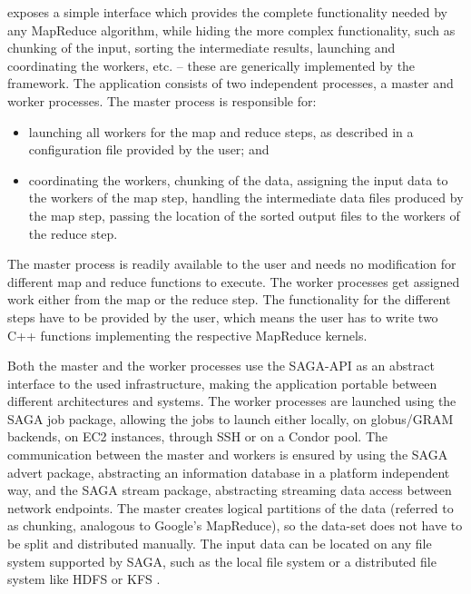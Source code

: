 \documentclass[3p,twocolumn]{elsarticle}
\begin{document}
\smr exposes a simple interface which provides the complete
functionality needed by any MapReduce algorithm, while hiding the more
complex functionality, such as chunking of the input, sorting the
intermediate results, launching and coordinating the workers, etc. --
these are generically implemented by the framework.  The application
consists of two independent processes, a master and worker processes.
The master process is responsible for:

\begin{itemize}

 \item launching all workers for the map and reduce steps, as
 described in a configuration file provided by the user; and

 \item coordinating the workers, chunking of the data, assigning the
 input data to the workers of the map step, handling the intermediate
 data files produced by the map step, passing the location of the
 sorted output files to the workers of the reduce step.  


\end{itemize}

The master process is readily available to the user and needs no
modification for different map and reduce functions to execute.  The
worker processes get assigned work either from the map or the reduce
step. The functionality for the different steps have to be provided by
the user, which means the user has to write two C++ functions
implementing the respective MapReduce kernels.

Both the master and the worker processes use the SAGA-API as an
abstract interface to the used infrastructure, making the application
portable between different architectures and systems.  The worker
processes are launched using the SAGA job package, allowing the jobs
to launch either locally, on globus/GRAM backends, on EC2 instances, through SSH
or on a Condor pool. The communication between the master and workers
is ensured by using the SAGA advert package, abstracting an
information database in a platform independent way, and the SAGA stream
package, abstracting streaming data access between network endpoints.
The master creates logical partitions of the data (referred to as chunking,
analogous to Google's MapReduce), so the data-set does not have to be split
and distributed manually.  The input data can be located on any file system
supported by SAGA, such as the local file system or a distributed file system
like HDFS or KFS \cite{KFS}.
\end{document}
